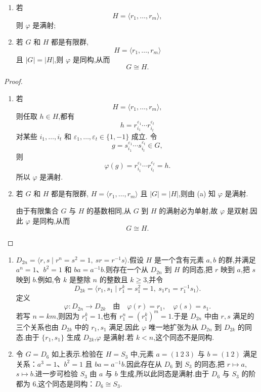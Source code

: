 \begin{corollary}
	\begin{enumerate}[label=(\alph*)]
	\item 若
	\[
	H=\langle r_1,\ldots,r_m\rangle,
	\]
	则 $\varphi$ 是满射;
	
	\item 若 $G$ 和 $H$ 都是有限群,
	\[
	H=\langle r_1,\ldots,r_m\rangle
	\]
	且 $|G|=|H|$,则 $\varphi$ 是同构,从而
	\[
	G\cong H.
	\]
\end{enumerate}
\end{corollary}
\newpage
\begin{proof}
	\begin{enumerate}[label=(\alph*)]
			\item 若
			\[
			H=\langle r_1,\ldots,r_m\rangle,
			\]
			则任取 $h\in H$,都有
			\[
			h=r_{i_1}^{\varepsilon_1}\cdots r_{i_t}^{\varepsilon_t}
			\]
			对某些 $i_1,\ldots,i_t$ 和
			$\varepsilon_1,\ldots,\varepsilon_t\in\{1,-1\}$ 成立.
			令
			\[
			g=s_{i_1}^{\varepsilon_1}\cdots s_{i_t}^{\varepsilon_t}\in G,
			\]
			则
			\[
			\varphi(g)
			=
			r_{i_1}^{\varepsilon_1}\cdots r_{i_t}^{\varepsilon_t}
			=h.
			\]
			所以 $\varphi$ 是满射.
			
			\item 若 $G$ 和 $H$ 都是有限群,
			$H=\langle r_1,\ldots,r_m\rangle$ 且 $|G|=|H|$,则由
			(a) 知 $\varphi$ 是满射.
			
			由于有限集合 $G$ 与 $H$ 的基数相同,从 $G$ 到 $H$
			的满射必为单射,故 $\varphi$ 是双射.因此 $\varphi$
			是同构,从而
			\[
			G\cong H.
			\]
		\end{enumerate}
\end{proof}
\begin{example}
	\begin{enumerate}[label=(\arabic*)]
		\item  $D_{2n}=\langle r,s\mid r^n=s^2=1,\ sr=r^{-1}s\rangle$.假设 $H$ 是一个含有元素 $a,b$ 的群,并满足 $a^n=1$、$b^2=1$ 和 $ba=a^{-1}b$.则存在一个从 $D_{2n}$ 到 $H$ 的同态,把 $r$ 映到 $a$,把 $s$ 映到 $b$.例如,令 $k$ 是整除 $n$ 的整数且 $k\geq3$,并令
		\[
		D_{2k}=\langle r_1,s_1\mid r_1^k=s_1^2=1,\ s_1r_1=r_1^{-1}s_1\rangle.
		\]
		定义
		\[
		\varphi:D_{2n}\to D_{2k}\quad\text{由}\quad \varphi(r)=r_1,
		\quad \varphi(s)=s_1.
		\]
		若写 $n=km$,则因为 $r_1^k=1$,也有 $r_1^n=(r_1^k)^m=1$.于是 $D_{2n}$ 中由 $r,s$ 满足的三个关系也由 $D_{2k}$ 中的 $r_1,s_1$ 满足.因此 $\varphi$ 唯一地扩张为从 $D_{2n}$ 到 $D_{2k}$ 的同态.由于 $\{r_1,s_1\}$ 生成 $D_{2k}$,$\varphi$ 是满射.若 $k<n$,这个同态不是同构.
		\item 令 $G=D_6$ 如上表示.检验在 $H=S_3$ 中,元素 $a=(1\ 2\ 3)$ 与 $b=(1\ 2)$ 满足关系：$a^3=1$、$b^2=1$ 且 $ba=a^{-1}b$.因此存在从 $D_6$ 到 $S_3$ 的同态,把 $r\mapsto a$,$s\mapsto b$.进一步可检验 $S_3$ 由 $a$ 与 $b$ 生成,所以此同态是满射.由于 $D_6$ 与 $S_3$ 的阶都为 $6$,这个同态是同构：$D_6\cong S_3$.
	\end{enumerate}
\end{example}
